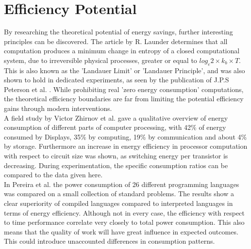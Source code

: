 \section{Efficiency Potential}\label{sec:potential} 
By researching the theoretical potential of energy savings, further interesting principles can be discovered. The article by R. Launder \cite{entropy} determines that all computation produces a minimum change in entropy of a closed computational system, due to irreversible physical processes, greater or equal to $log_e 2 \times k_b \times T$. This is also known as the 'Landauer Limit' or 'Landauer Principle', and was also shown to hold in dedicated experiments, as seen by the publication of J.P.S Peterson et al. \cite{entropy-demo}. While prohibiting real 'zero energy consumption' computations, the theoretical efficiency boundaries are far from limiting the potential efficiency gains through modern interventions.\\
A field study by Victor Zhirnov et al. \cite{min-energy} gave a qualitative overview of energy consumption of different parts of computer processing, with 42\% of energy consumed by Displays, 35\% by computing, 19\% by communication and about 4\% by storage. Furthermore an increase in energy efficiency in processor computation with respect to circuit size was shown, as switching energy per transistor is decreasing. During experimentation, the specific consumption ratios can be compared to the data given here.\\
In Pereira et al. \cite{Pereira} the power consumption of 26 different programming languages was compared on a small collection of standard problems. The results show a clear superiority of compiled languages compared to interpreted languages in terms of energy efficiency. Although not in every case, the efficiency with respect to time performance correlate very closely to total power consumption. This also means that the quality of work will have great influence in expected outcomes. This could introduce unaccounted differences in consumption patterns.\\